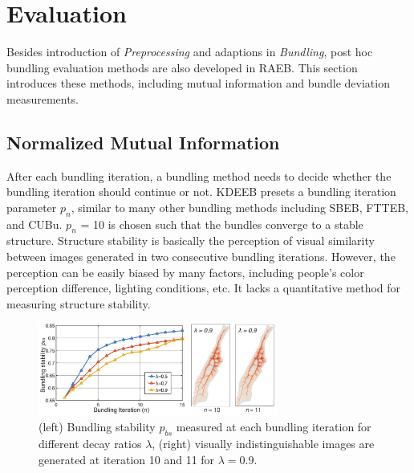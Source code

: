 \section{Evaluation}
\label{sec:eva}

Besides introduction of \textit{Preprocessing} and adaptions in \textit{Bundling}, post hoc bundling evaluation methods are also developed in RAEB.
This section introduces these methods, including mutual information and bundle deviation measurements.

\subsection{Normalized Mutual Information}
After each bundling iteration, a bundling method needs to decide whether the bundling iteration should continue or not.
KDEEB presets a bundling iteration parameter $p_n$, similar to many other bundling methods including SBEB, FTTEB, and CUBu.
$p_n$ = 10 is chosen such that the bundles converge to a stable structure.
Structure stability is basically the perception of visual similarity between images generated in two consecutive bundling iterations.
However, the perception can be easily biased by many factors, including people's color perception difference, lighting conditions, etc.
It lacks a quantitative method for measuring structure stability.

\begin{figure}[t]
	\centering
	\includegraphics[width=0.7\textwidth]{figure/edgebundling/fig5_NMI/bundle_termination.pdf}
	\vspace{-5mm}
	\caption{(left) Bundling stability $p_{bs}$ measured at each bundling iteration for different decay ratios $\lambda$, (right) visually indistinguishable images are generated at iteration 10 and 11 for $\lambda=0.9$.}
	\label{fig:nmi}
	\vspace{-1mm}
\end{figure}


